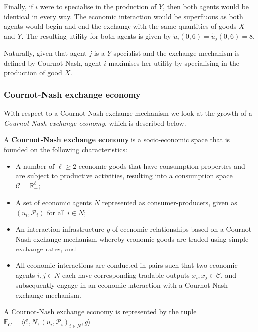 \begin{example}
Finally, if $i$ were to specialise in the production of $Y$, then both agents would be identical in every way. The economic interaction would be superfluous as both agents would begin and end the exchange with the same quantities of goods $X$ and $Y$. The resulting utility for both agents is given by $\tilde{u}_{i} \left( 0, 6 \right) = \tilde{u}_{j} \left( 0, 6 \right) = 8$.

Naturally, given that agent $j$ is a $Y$-specialist and the exchange mechanism is defined by Cournot-Nash, agent $i$ maximises her utility by specialising in the production of good $X$.
\end{example}

\subsubsection{Cournot-Nash exchange economy}

With respect to a Cournot-Nash exchange mechanism we look at the growth of a \emph{Cournot-Nash exchange economy}, which is described below.
\begin{definition}
A \textbf{Cournot-Nash exchange economy} is a socio-economic space that is founded on the following characteristics:
\begin{itemize}
	\item A number of $\ell \geqslant 2$ economic goods that have consumption properties and are subject to productive activities, resulting into a consumption space $\mathcal{C} = \mathbb{R}^{\ell}_{+}$;

	\item A set of economic agents $N$ represented as consumer-producers, given as $\left( u_{i}, \mathcal{P}_{i} \right)$ for all $i \in N$;

	\item An interaction infrastructure $g$ of economic relationships based on a Cournot-Nash exchange mechanism whereby economic goods are traded using simple exchange rates; and

	\item All economic interactions are conducted in pairs such that two economic agents $i,j \in N$ each have corresponding tradable outputs $x_{i}, x_{j} \in \mathcal{C}$, and subsequently engage in an economic interaction with a Cournot-Nash exchange mechanism.
\end{itemize}
A Cournot-Nash exchange economy is represented by the tuple $\mathbb{E}_{C} = \big \langle \mathcal{C}, N, (u_{i}, \mathcal{P}_{i})_{i \in N}, g \big \rangle$
\end{definition}


